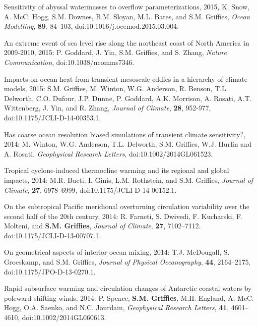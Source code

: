 \begin{etaremune}
\item Sensitivity of abyssal watermasses to overflow
  parameterizations, 2015, K. Snow, A. McC. Hogg, S.M. Downes,
  B.M. Sloyan, M.L. Bates, and S.M. Grif\/f\/ies, {\it Ocean
    Modelling}, {\bf 89}, 84--103,
  doi:10.1016/j.ocemod.2015.03.004.

\item An extreme event of sea level rise along the northeast coast of
  North America in 2009-2010, 2015: P.  Goddard, J. Yin, S.M. Grif\/f\/ies, and S. Zhang, {\it Nature Communication}, doi:10.1038/ncomms7346.

\item Impacts on ocean heat from transient mesoscale eddies in a
  hierarchy of climate models, 2015: S.M. Grif\/f\/ies,
  M. Winton, W.G. Anderson, R. Benson, T.L. Delworth, C.O. Dufour,
  J.P. Dunne, P. Goddard, A.K. Morrison, A. Rosati, A.T. Wittenberg,
  J. Yin, and R. Zhang, {\it Journal of Climate}, {\bf 28}, 952-977,
  doi:10.1175/JCLI-D-14-00353.1.

\item Has coarse ocean resolution biased simulations of transient
  climate sensitivity?, 2014: M.  Winton, W.G. Anderson,
  T.L. Delworth, S.M. Grif\/f\/ies, W.J. Hurlin and A. Rosati,
  {\it Geophysical Research Letters}, doi:10.1002/2014GL061523.

\item Tropical cyclone-induced thermocline warming and its regional
  and global impacts, 2014: M.R. Bueti, I. Ginis, L.M. Rothstein, and
  S.M. Grif\/f\/ies, {\it Journal of Climate}, {\bf 27},
  6978--6999, doi:10.1175/JCLI-D-14-00152.1.

\item On the subtropical Pacific meridional overturning circulation
  variability over the second half of the 20th century, 2014:
  R. Farneti, S. Dwivedi, F. Kucharski, F. Molteni, and {\bf
    S.M. Grif\/f\/ies}, {\it Journal of Climate}, {\bf 27},
  7102--7112.  doi:10.1175/JCLI-D-13-00707.1.

\item On geometrical aspects of interior ocean mixing, 2014:
  T.J. McDougall, S. Groeskamp, and S.M. Grif\/f\/ies, {\it
    Journal of Physical Oceanography}, {\bf 44}, 2164--2175,
  doi:10.1175/JPO-D-13-0270.1.

\item Rapid subsurface warming and circulation changes of Antarctic
  coastal waters by poleward shifting winds, 2014: P. Spence, {\bf
    S.M. Grif\/f\/ies}, M.H. England, A. McC. Hogg, O.A. Saenko, and
  N.C. Jourdain, {\it Geophysical Research Letters}, {\bf 41},
  4601--4610, doi:10.1002/2014GL060613.


\end{etaremune}
